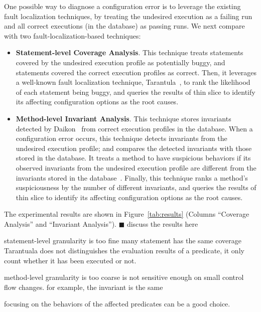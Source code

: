 

One possible way to diagnose a configuration error is to leverage
the existing fault localization techniques, by treating the undesired
execution as a failing run and all correct executions (in the database)
as passing runs. We next compare \ourtool with two fault-localization-based
techniques: %

\begin{itemize}
\item \textbf{Statement-level Coverage Analysis}. This technique treats statements covered
by the undesired execution profile as potentially buggy, and statements
covered the correct execution profiles as correct.
Then, it leverages a well-known fault localization technique,
Tarantula~\cite{Jones:2002}, to rank the likelihood of each
statement being buggy, and queries the results of thin slice
to identify its affecting configuration options as the root causes.

\item \textbf{Method-level Invariant Analysis}. This technique stores invariants detected
by Daikon~\cite{Ernst:1999} from correct execution profiles in the database.
When a configuration error occurs, this technique detects invariants from the undesired execution profile;
and compares the detected invariants with those stored in the database.
It treats a method to have suspicious behaviors if its observed invariants
from the undesired execution profile are different from the invariants stored
in the database~\cite{McCamant:2003}. Finally, this technique ranks a method's suspiciousness by
the number of different invariants, and queries the results of thin slice
to identify its affecting configuration options as the root causes. 
\end{itemize}


The experimental results are shown in Figure~\ref{tab:results} (Columns
``Coverage Analysis'' and ``Invariant Analysis'').
$\blacksquare$ discuss the results here

statement-level granularity is too fine
many statement has the same coverage
Tarantuala does not distinguishes the evaluation results of a predicate, it only count whether it has been executed or not.


method-level granularity is too coarse
is not sensitive enough on small control flow changes. for example, the invariant is the same


focusing on the behaviors of the affected predicates can be a good choice.
